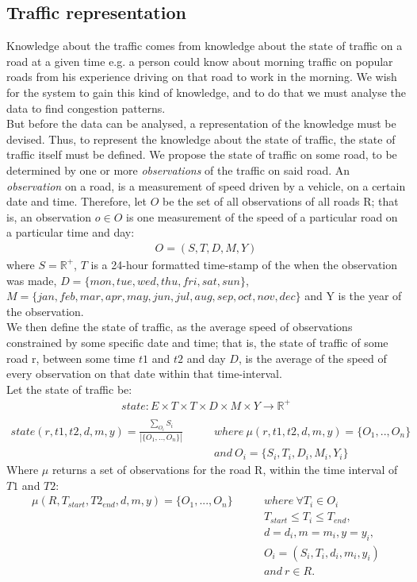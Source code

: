 \subsection{Traffic representation}
Knowledge about the traffic comes from knowledge about the state of traffic on a road at a given time e.g. a  person could know about morning traffic on popular roads from his experience driving on that road to work in the morning. We wish for the system to gain this kind of knowledge, and to do that we must analyse the data to find congestion patterns.\\
But before the data can be analysed, a representation of the knowledge must be devised. Thus, to represent the knowledge about the state of traffic, the state of traffic itself must be defined. We propose the state of traffic on some road, to be determined by one or more \emph{observations} of the traffic on said road. An \emph{observation} on a road, is a measurement of speed driven by a vehicle, on a certain date and time. Therefore, let $O$ be the set of all observations of all roads R; that is, an observation $o \in O$ is one measurement of the speed of a particular road on a particular time and day:
\begin{align*}
O = (S, T, D, M, Y)
\end{align*}
where $S = \mathbb R^{+}$, $T$ is a 24-hour formatted time-stamp of the when the observation was made, $D= \{mon, tue, wed, thu, fri, sat, sun\}$,\\ $M = \{jan, feb, mar, apr, may, jun, jul, aug, sep, oct, nov, dec\}$ and Y is the year of the observation. \\
We then define the state of traffic, as the average speed of observations constrained by some specific date and time; that is, the state of traffic of some road r, between some time $t1$ and $t2$ and day $D$, is the average of the speed of every observation on that date within that time-interval.\\
Let the state of traffic be:
\begin{align*}
state: E \times T \times T \times D \times M \times Y \rightarrow \mathbb R^+\\
\end{align*}
\begin{align*}
state(r, t1, t2, d, m, y) = \frac{\sum\limits_{O_i} S_i}{|\{O_1,..,O_n\}|} \qquad 
&where \: \mu (r,t1,t2, d, m, y) = \{O_1,..,O_n\} \\
&and \: O_i=\{S_i, T_i, D_i, M_i, Y_i\}
\end{align*}
Where $\mu$ returns a set of observations for the road R, within the time interval of $T1$ and $T2$:
\begin{align*}
\mu(R,T_{start},T2_{end}, d, m, y) = \{O_1,...,O_n\} \qquad &where \: \forall T_i \in O_i\\
&T_{start} \leq T_i \leq T_{end}, \\
&d = d_i, m = m_i, y = y_i, \\
&O_i = (S_i, T_i, d_i, m_i, y_i) \\
&and \: r \in R.\\
\end{align*}